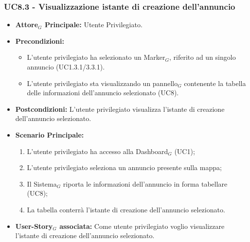 \documentclass[10pt]{article}
\begin{document}
\begin{justify}
 \subsubsection{\textbf{UC8.3 - Visualizzazione istante di creazione dell'annuncio}}
 \begin{itemize}
     \item \textbf{Attore$_G$ Principale:} Utente Privilegiato.
     \item \textbf{Precondizioni:}
       \begin{itemize}
    	        \item L'utente privilegiato ha selezionato un Marker$_G$, riferito ad un singolo annuncio (UC1.3.1/3.3.1).
          \item L'utente privilegiato sta visualizzando un pannello$_G$ contenente la tabella delle informazioni dell'annuncio selezionato (UC8).
       \end{itemize}
     \item \textbf{Postcondizioni:} L'utente privilegiato visualizza l'istante di creazione dell'annuncio selezionato.
     \item \textbf{Scenario Principale:}
        \begin{enumerate}
            \item L'utente privilegiato ha accesso alla Dashboard$_G$ (UC1);
            \item L'utente privilegiato seleziona un annuncio presente sulla mappa;
            \item Il Sistema$_G$ riporta le informazioni dell'annuncio in forma tabellare (UC8);
            \item La tabella conterrà l'istante di creazione dell'annuncio selezionato.
        \end{enumerate}
     \item \textbf{User-Story$_G$ associata:} Come utente privilegiato voglio visualizzare l'istante di creazione dell'annuncio selezionato. 
 \end{itemize}

\end{justify}
\end{document}
